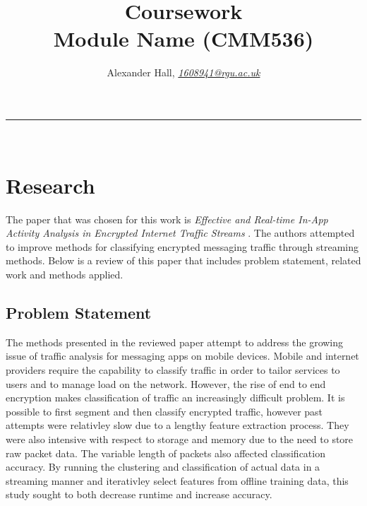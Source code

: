 \documentclass[10pt]{article}
\begin{document}



\title{\LARGE Coursework  \\ Module Name (CMM536)}

\author{Alexander Hall, \textit{\href{1608941@rgu.ac.uk}{1608941@rgu.ac.uk}}}
\maketitle
\noindent\rule{16cm}{0.4pt}
\ \\

\section{Research}

The paper that was chosen for this work is \textit{Effective and Real-time In-App Activity Analysis in Encrypted Internet Traffic Streams} \cite{Liu:2017:ERI:3097983.3098049}. The authors attempted to improve methods for classifying encrypted messaging traffic through streaming methods. Below is a review of this paper that includes problem statement, related work and methods applied.\\


\subsection{Problem Statement}

The methods presented in the reviewed paper attempt to address the growing issue of traffic analysis for messaging apps on mobile devices. Mobile and internet providers require the capability to classify traffic in order to tailor services to users and to manage load on the network. However, the rise of end to end encryption makes classification of traffic an increasingly difficult problem. It is possible to first segment and then classify encrypted traffic, however past attempts were relativley slow due to a lengthy feature extraction process. They were also intensive with respect to storage and memory due to the need to store raw packet data. The variable length of packets also affected classification accuracy. By running the clustering and classification of actual data in a streaming manner and iterativley select features from offline training data, this study sought to both decrease runtime and increase accuracy.
\end{document}
